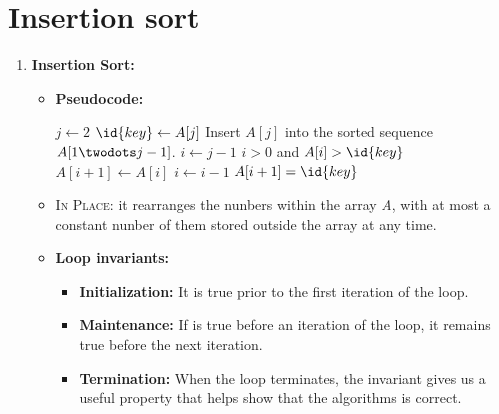 \documentclass{report}
\begin{document}
\section{Insertion sort}
\begin{enumerate}[leftmargin=*]
    \item \textbf{Insertion Sort:}
    \begin{itemize}
        \item \textbf{Pseudocode:} 
        \begin{codebox}
        \li \For $j \gets 2$ \To {}
                \Do 
        \li     $\id{key} \gets A[j]$ 
        \li     \Comment Insert $A[j]$ into the sorted sequence $A[1 \twodots j-1]$.
        \li     $i \gets j-1$
        \li     \While $i > 0$ and $A[i] > \id{key}$
                    \Do
        \li         $A[i+1] \gets A[i]$ 
        \li         $i \gets i-1$
                    \End
        \li     $A[i+1] = \id{key}$
                \End
        \end{codebox}
        \item \textsc{In Place}: it rearranges the nunbers within the array \emph{A}, with at most a constant nunber of them stored outside the array at any time. 
        \item \textbf{Loop invariants:}
        \begin{itemize}
            \item \textbf{Initialization:} It is true prior to the first iteration of the loop.
            \item \textbf{Maintenance:} If is true before an iteration of the loop, it remains true before the next iteration.
            \item \textbf{Termination:} When the loop terminates, the invariant gives us a useful property that helps show that the algorithms is correct.
        \end{itemize}
    \end{itemize}
\end{enumerate}
\end{document}
